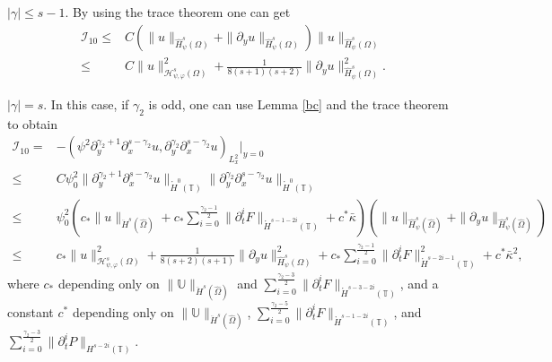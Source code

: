 \documentclass{amsart}
\numberwithin{equation}{section}
\begin{document}

 $|\gamma|\leq s-1$. By using the trace theorem one can get
\begin{align*}
\mathcal{I}_{10}
\leq& C(\|u\|_{\hat{H}_{\psi}^{s}(\Omega)}+\|\partial_{y}u\|_{\hat{H}_{\psi}^{s}(\Omega)})
       \|u\|_{\hat{H}_{\psi}^{s}(\Omega)}\\
\leq& C\|u\|_{\mathcal{H}_{\psi,\varphi}^{s}(\Omega)}^{2}
     +\frac{1}{8(s+1)(s+2)}\|\partial_{y}u\|_{\hat{H}_{\psi}^{s}(\Omega)}^{2}.
\end{align*}

 $|\gamma|=s$.  In this case, if $\gamma_{2}$ is odd, one can use Lemma \ref{bc} and the trace theorem to obtain
\begin{align*}
\mathcal{I}_{10}
=&-(\psi^{2}\partial_{y}^{\gamma_{2}+1}\partial_{x}^{s-\gamma_{2}}u, \partial_{y}^{\gamma_{2}}\partial_{x}^{s-\gamma_{2}}u)_{L_{x}^{2}}|_{y=0}\\
\leq& C\psi_{0}^{2}\|\partial_{y}^{\gamma_{2}+1}\partial_{x}^{s-\gamma_{2}}u\|_{\mathring{H}^{0}(\mathbb{T})}
       \|\partial_{y}^{\gamma_{2}}\partial_{x}^{s-\gamma_{2}}u\|_{\mathring{H}^{0}(\mathbb{T})}\\
\leq& \psi_{0}^{2}\left(c_{*}\|u\|_{\ddot{H}^{s}(\hat{\Omega})}
                        +c_{*}\sum_{i=0}^{\frac{\gamma_{2}-1}{2}}\|\partial_{t}^{i}F\|_{\mathring{H}^{s-1-2i}(\mathbb{T})}
                        +c^{*}\bar{\kappa}\right)
                  \left(\|u\|_{\hat{H}_{\psi}^{s}(\hat{\Omega})}+\|\partial_{y}u\|_{\hat{H}_{\psi}^{s}(\hat{\Omega})}\right)\\
\leq& c_{*}\|u\|_{\mathcal{H}_{\psi,\varphi}^{s}(\Omega)}^{2}
     +\frac{1}{8(s+2)(s+1)}\|\partial_{y}u\|_{\hat{H}_{\psi}^{s}(\Omega)}^{2}
     +c_{*}\sum_{i=0}^{\frac{\gamma_{2}-1}{2}}\|\partial_{t}^{i}F\|_{\mathring{H}^{s-2i-1}(\mathbb{T})}^{2}
     +c^{*}\bar{\kappa}^{2},
\end{align*}
where $c_{*}$ depending only on $\|\mathbb{U}\|_{\ddot{H}^{s}(\hat{\Omega})}$ and
$\sum\limits_{i=0}^{\frac{\gamma_{2}-3}{2}}\|\partial_{t}^{i}F\|_{\mathring{H}^{s-3-2i}(\mathbb{T})}$,
and a constant  $c^{*}$ depending only on $\|\mathbb{U}\|_{\ddot{H}^{s}(\hat{\Omega})}$,
$\sum\limits_{i=0}^{\frac{\gamma_{2}-5}{2}}\|\partial_{t}^{i}F\|_{\mathring{H}^{s-1-2i}(\mathbb{T})}$,
and $\sum\limits_{i=0}^{\frac{\gamma_{2}-3}{2}}\|\partial_{t}^{i}P\|_{H^{s-2i}(\mathbb{T})}$.
\end{document}

